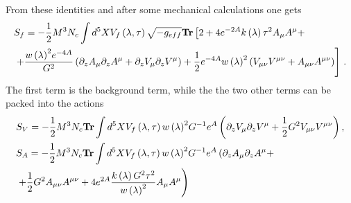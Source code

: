 \documentclass[a4paper,12pt]{article}
\begin{document}
From these identities and after some mechanical calculations one gets
\begin{align}
&S_f = - \frac{1}{2} M^3 N_c \int d^5 X V_f \left(\lambda, \tau \right) \sqrt{- g_{eff}} \bold{Tr} \left[ 2 + 4 e^{-2A} k\left( \lambda \right) \tau^2 A_\mu A^\mu + \right. \notag \\
& \left. + \frac{{w\left(\lambda\right)}^2 e^{-4A}}{G^2} \left( \partial_z A_\mu \partial_z A^\mu +  \partial_z V_\mu \partial_z V^\mu \right) + \frac{1}{2} e^{-4A} {w\left(\lambda\right)}^2 \left( V_{\mu \nu}V^{\mu \nu} + A_{\mu \nu} A^{\mu \nu} \right) \right] \, .
\end{align}
The first term is the background term, while the the two other terms can be packed into the actions
\begin{align}
\label{eq:VM_action}
&S_V = - \frac{1}{2} M^3 N_c \bold{Tr} \int d^5 XV_{f} \left( \lambda, \tau \right) {w\left(\lambda\right)}^2 G^{-1} e^{A} \left( \partial_z V_\mu \partial_z V^\mu + \frac{1}{2} G^2 V_{\mu \nu} V^{\mu \nu} \right), \\
& S_A = - \frac{1}{2} M^3 N_c \bold{Tr} \int d^5 X V_{f} \left( \lambda, \tau \right) {w\left(\lambda\right)}^2 G^{-1} e^{A} \left( \partial_z A_\mu \partial_z A^\mu + \right. \notag \\
& \left. +  \frac{1}{2} G^2 A_{\mu \nu} A^{\mu \nu} + 4 e^{2A} \frac{k\left(\lambda\right) G^2 \tau^2}{{w\left(\lambda\right)}^2} A_\mu A^\mu \right)
\end{align}
\end{document}
